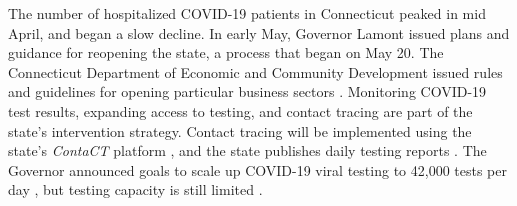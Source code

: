\documentclass[11pt]{article}
\begin{document}

The number of hospitalized COVID-19 patients in Connecticut peaked in mid April, and began a slow decline.  In early May, Governor Lamont issued plans and guidance for reopening the state, a process that began on May 20. The Connecticut Department of Economic and Community Development issued rules and guidelines for opening particular business sectors \citep{decd2020coronavirus}. 
Monitoring COVID-19 test results, expanding access to testing, and contact tracing are part of the state's intervention strategy.  Contact tracing will be implemented using the state's \emph{ContaCT} platform \citep{ct2020contact}, and the state publishes daily testing reports \citep[e.g.][]{ct2020testing}. 
The Governor announced goals to scale up COVID-19 viral testing to 42,000 tests per day \citep{lamont2020suspension,phaneuf2020lamont}, but testing capacity is still limited \cite{thomas2020surge}. 

\end{document}
